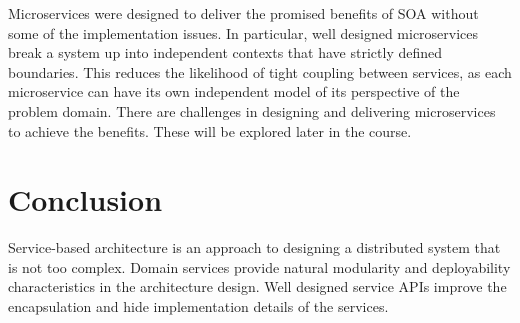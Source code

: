 Microservices were designed to deliver the promised benefits of SOA without some of the implementation issues.
In particular, well designed microservices break a system up into independent contexts that have strictly defined boundaries.
This reduces the likelihood of tight coupling between services,
as each microservice can have its own independent model of its perspective of the problem domain.
There are challenges in designing and delivering microservices to achieve the benefits.
These will be explored later in the course.


\section{Conclusion}

Service-based architecture is an approach to designing a distributed system that is not too complex.
Domain services provide natural modularity and deployability characteristics in the architecture design.
Well designed service APIs improve the encapsulation and hide implementation details of the services.
